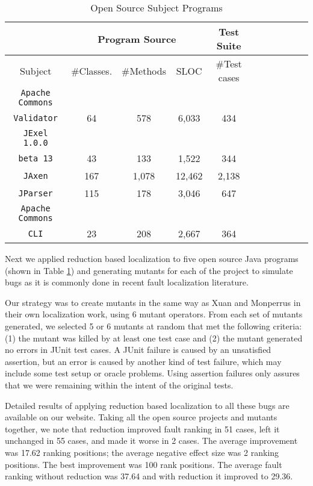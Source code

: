 


\begin{table}
{\scriptsize
\begin{center}
\begin{tabular}{|c||c|c|c|c|c||c|c|c|c|c|}
\hline
\hline
& \multicolumn{3}{|c|}{Program Source} & \multicolumn{1}{|c|}{Test Suite} \\
\hline
Subject & \#Classes. & \#Methods & SLOC & \#Test cases \\
\hline
\hline
{\tt Apache Commons} & & & & \\
{\tt Validator} & 64 & 578 & 6,033 & 434 \\
\hline
{\tt JExel 1.0.0} & & & & \\
{\tt beta 13} & 43 & 133 & 1,522	 & 344  \\
\hline
{\tt JAxen} & 167 & 1,078 & 12,462 & 2,138\\
\hline
{\tt JParser} & 115 & 178 & 3,046 & 647 \\
\hline
{\tt Apache Commons} & & & & \\
{\tt CLI} & 23 & 208 & 2,667 & 364 \\ 
\hline
\hline
\end{tabular}
\end{center}
}
\caption{Open Source Subject Programs}
\label{tab:opensourcesubs}
\end{table}



Next we applied reduction based localization to five open source Java
programs (shown in Table \ref{tab:opensourcesubs}) and generating mutants for each of the project to simulate bugs as it is commonly done in recent fault localization literature.\cite{mutant} \cite{PureTest}





 
Our strategy was to create mutants in the same way as Xuan and
Monperrus \cite{PureTest} in their own localization work, using 6
mutant operators.  From each set of mutants generated, we selected 5
or 6 mutants at random that met the following criteria: (1) the mutant
was killed by at least one test case and (2) the mutant generated no
errors in JUnit test cases.  A JUnit failure is caused by an
unsatisfied assertion, but an error is caused by another kind of test
failure, which may include some test setup or oracle problems.  Using
assertion failures only assures that we were remaining within the
intent of the original tests.

Detailed results of applying reduction based localization to all these bugs are available on our website. Taking all
the open source projects and mutants together, we note that reduction
improved fault ranking in 51 cases, left it unchanged in 55 cases, and
made it worse in 2 cases.  The average improvement was 17.62 ranking
positions; the average negative effect size was 2 ranking positions.
The best improvement was 100
rank positions.  The average fault ranking without
reduction was 37.64 and with reduction it improved to 29.36.  